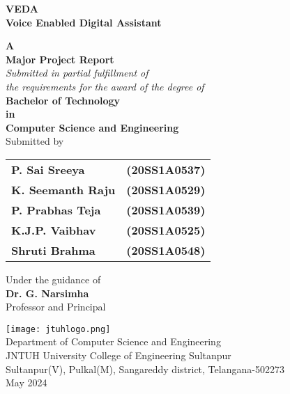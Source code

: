 \documentclass[12pt,a4paper]{report}
\begin{document}
\begin{titlepage}
    \begin{center}
        \begin{LARGE}
            \textbf{VEDA}\\[0cm]
            \textbf{Voice Enabled Digital Assistant}\\[.35cm]
        \end{LARGE}
        \textbf{\large A}\\
        \textbf{\large Major Project Report}\\[.5cm]        
        \textit{\large Submitted in partial fulfillment of\\ the requirements for the award of the degree of}\\[1cm]
        \textup{\Large \textbf{Bachelor of Technology }}\\
        \textbf{\Large in}\\
        \textup{\Large \textbf{Computer Science and Engineering} }\\[0.5cm]
        \textup{\large Submitted by}\\[1cm]
        \begin{table}[ht]
            \centering
            \begin{tabular}{l r}
                {\large \textbf{P. Sai Sreeya}} & {\large \textbf{(20SS1A0537)}}\\
                {\large \textbf{K. Seemanth Raju}} & {\large \textbf{(20SS1A0529)}}\\
                {\large \textbf{P. Prabhas Teja}} & {\large \textbf{(20SS1A0539)}}\\
                {\large \textbf{K.J.P. Vaibhav}} & {\large \textbf{(20SS1A0525)}}\\
                {\large \textbf{Shruti Brahma}} & {\large \textbf{(20SS1A0548)}}\\
            \end{tabular}
        \end{table}
        \textup{\Large Under the guidance of}\\[.5cm]
        \textbf{\Large Dr. G. Narsimha }\\[0cm]
        Professor and Principal
            
        \texttt{[image: jtuhlogo.png]}\\[.5cm]
        
        
            {\large {Department of Computer Science and Engineering}\\[.1cm]}
            {\large {JNTUH University College of Engineering Sultanpur}\\[.1cm]}
            {\large Sultanpur(V), Pulkal(M), Sangareddy district, Telangana-502273\\[.1cm]}
            {\large May 2024\\[.1cm]}
        
    \end{center}    
\end{titlepage}
\end{document}
